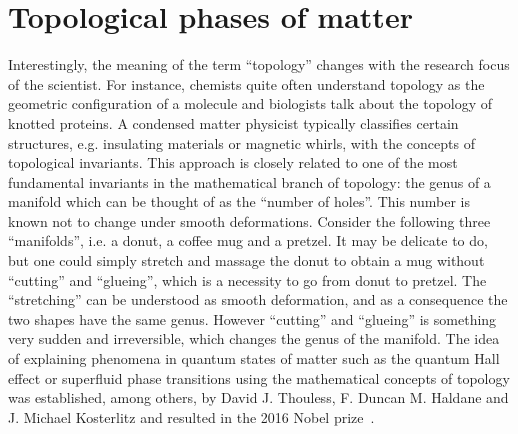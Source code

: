 %
%
\chapter{Topological phases of matter}
\label{ch:topological_phases_of_matter}
%
%
Interestingly, the meaning of the term ``topology'' changes with the research focus of the scientist.
For instance, chemists quite often understand topology as the geometric configuration of a molecule and biologists talk about the topology of knotted proteins.
A condensed matter physicist typically classifies certain structures, e.g. insulating materials or magnetic whirls, with the concepts of topological invariants.
This approach is closely related to one of the most fundamental invariants in the mathematical branch of topology: the genus of a manifold which can be thought of as the ``number of holes''.
This number is known not to change under smooth deformations.
Consider the following three ``manifolds'', i.e. a donut, a coffee mug and a pretzel.
It may be delicate to do, but one could simply stretch and massage the donut to obtain a mug without ``cutting'' and ``glueing'', which is a necessity to go from donut to pretzel.
The ``stretching'' can be understood as smooth deformation, and as a consequence the two shapes have the same genus.
However ``cutting'' and ``glueing'' is something very sudden and irreversible, which changes the genus of the manifold.
The idea of explaining phenomena in quantum states of matter such as the quantum Hall effect or superfluid phase transitions using the mathematical concepts of topology was established, among others, by David J. Thouless, F. Duncan M. Haldane and J. Michael Kosterlitz and resulted in the 2016 Nobel prize~\cite{NP2016}.

